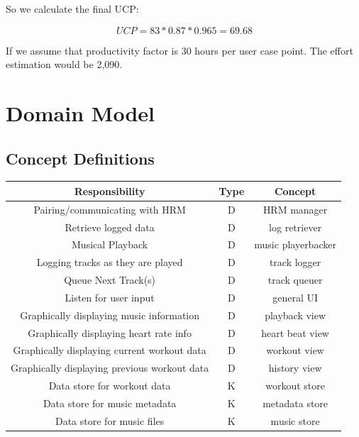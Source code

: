 \documentclass[letterpaper,english, 12pt]{scrreprt}
\begin{document}
So we calculate the final UCP:

\begin{equation}
UCP = 83*0.87*0.965 = 69.68
\end{equation}

If we assume that productivity factor is 30 hours per user case point. The effort estimation would be 2,090.

\chapter{Domain Model}
    \section{Concept Definitions}
		\begin{center}
		\renewcommand{\arraystretch}{1.5}
	        \begin{tabular}[h]{|c|c|c|}
	           \hline
	           Responsibility & Type & Concept\\
	           \hline
	           Pairing/communicating with HRM & D & HRM manager\\
	           \hline
	           Retrieve logged data & D & log retriever\\
	           \hline
	           Musical Playback & D & music playerbacker\\
	           \hline
	           Logging tracks as they are played & D & track logger\\
	           \hline
	           Queue Next Track(s) & D & track queuer\\
	           \hline
	           Listen for user input & D & general UI\\
	           \hline
	           Graphically displaying music information & D & playback view\\
	           \hline
	           Graphically displaying heart rate info & D & heart beat view\\
	           \hline
	           Graphically displaying current workout data & D & workout view\\
	           \hline
	           Graphically displaying previous workout data & D & history view\\
	           \hline
	           Data store for workout data & K & workout store\\
	           \hline
	           Data store for music metadata & K & metadata store\\
	           \hline
	           Data store for music files & K & music store\\
	           \hline
	       \end{tabular}
		\end{center}
	   
\end{document}
